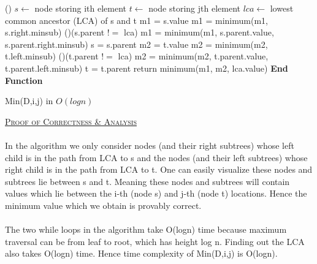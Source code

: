 \documentclass[a4 paper]{article}
\begin{document}
\begin{algorithm}[H]
\SetAlgoLined
{}
%
\Fn(){\FRecurs}
{
$s \leftarrow $ {node storing ith element}\;
$t \leftarrow $ {node storing jth element}\;
$lca \leftarrow $ {lowest common ancestor (LCA) of s and t}
{
m1 = s.value
{
    m1 = minimum(m1, s.right.minsub)\;
}
\While(){(s.parent $!=$ lca)}{
    {
        m1 = minimum(m1, s.parent.value, s.parent.right.minsub)\;   
    }
    s = s.parent\;
}
}
{
m2 = t.value
{
    m2 = minimum(m2, t.left.minsub)\;
}
\While(){(t.parent $!=$ lca)}{
    {
        m2 = minimum(m2, t.parent.value, t.parent.left.minsub)\;   
    }
    t = t.parent\;
}
}
return minimum(m1, m2, lca.value)
}
\textbf{End Function}
\caption{Min(D,i,j) in $O(logn)$}
\end{algorithm}
\vspace{4mm}
\underline{\textsc{Proof of Correctness \& Analysis}}\\\\
In the algorithm we only consider nodes (and their right subtrees) whose left child is in the path from LCA to s and the nodes (and their left subtrees) whose right child is in the path from LCA to t. One can easily visualize these nodes and subtrees lie between s and t. Meaning these nodes and subtrees will contain values which lie between the i-th (node s) and j-th (node t) locations. Hence the minimum value which we obtain is provably correct.\\\\
The two while loops in the algorithm take O(logn) time because maximum traversal can be from leaf to root, which has height log n. Finding out the LCA also takes O(logn) time. Hence time complexity of Min(D,i,j) is O(logn).
\end{document}
